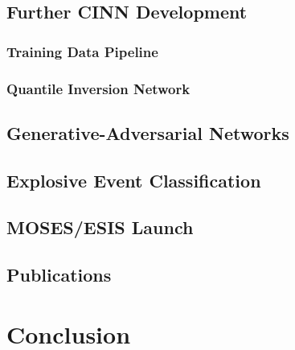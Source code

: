 \documentclass[10pt,letterpaper]{article}
\begin{document}
		\subsection{Further CINN Development}
		
			\subsubsection{Training Data Pipeline}
		
			\subsubsection{Quantile Inversion Network}
			
			\subsection{Generative-Adversarial Networks}	\label{sec_gan}
		
		\subsection{Explosive Event Classification}
		
			
		
		\subsection{MOSES/ESIS Launch}
		
		\subsection{Publications}
	
	\section{Conclusion}
	
\end{document}

